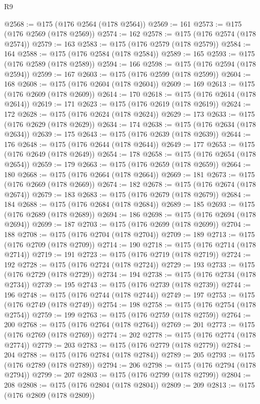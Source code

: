 \begin{lexlean}{R9}
\begin{coremodule}
{{{{{{{{{{{{{{{{{{{{{{{{{{{{{{{{{{{{{{{{{{{{{{{{{{{{{{{{{{{{{{{{{{{{{{{{{{{{{{{{{{{{{{{{{{{{{{{{{{{{{{{{{{{{@2568 := @175 (@176 @2564 (@178 @2564))
@2569 := 161
@2573 := @175 (@176 @2569 (@178 @2569))
@2574 := 162
@2578 := @175 (@176 @2574 (@178 @2574))
@2579 := 163
@2583 := @175 (@176 @2579 (@178 @2579))
@2584 := 164
@2588 := @175 (@176 @2584 (@178 @2584))
@2589 := 165
@2593 := @175 (@176 @2589 (@178 @2589))
@2594 := 166
@2598 := @175 (@176 @2594 (@178 @2594))
@2599 := 167
@2603 := @175 (@176 @2599 (@178 @2599))
@2604 := 168
@2608 := @175 (@176 @2604 (@178 @2604))
@2609 := 169
@2613 := @175 (@176 @2609 (@178 @2609))
@2614 := 170
@2618 := @175 (@176 @2614 (@178 @2614))
@2619 := 171
@2623 := @175 (@176 @2619 (@178 @2619))
@2624 := 172
@2628 := @175 (@176 @2624 (@178 @2624))
@2629 := 173
@2633 := @175 (@176 @2629 (@178 @2629))
@2634 := 174
@2638 := @175 (@176 @2634 (@178 @2634))
@2639 := 175
@2643 := @175 (@176 @2639 (@178 @2639))
@2644 := 176
@2648 := @175 (@176 @2644 (@178 @2644))
@2649 := 177
@2653 := @175 (@176 @2649 (@178 @2649))
@2654 := 178
@2658 := @175 (@176 @2654 (@178 @2654))
@2659 := 179
@2663 := @175 (@176 @2659 (@178 @2659))
@2664 := 180
@2668 := @175 (@176 @2664 (@178 @2664))
@2669 := 181
@2673 := @175 (@176 @2669 (@178 @2669))
@2674 := 182
@2678 := @175 (@176 @2674 (@178 @2674))
@2679 := 183
@2683 := @175 (@176 @2679 (@178 @2679))
@2684 := 184
@2688 := @175 (@176 @2684 (@178 @2684))
@2689 := 185
@2693 := @175 (@176 @2689 (@178 @2689))
@2694 := 186
@2698 := @175 (@176 @2694 (@178 @2694))
@2699 := 187
@2703 := @175 (@176 @2699 (@178 @2699))
@2704 := 188
@2708 := @175 (@176 @2704 (@178 @2704))
@2709 := 189
@2713 := @175 (@176 @2709 (@178 @2709))
@2714 := 190
@2718 := @175 (@176 @2714 (@178 @2714))
@2719 := 191
@2723 := @175 (@176 @2719 (@178 @2719))
@2724 := 192
@2728 := @175 (@176 @2724 (@178 @2724))
@2729 := 193
@2733 := @175 (@176 @2729 (@178 @2729))
@2734 := 194
@2738 := @175 (@176 @2734 (@178 @2734))
@2739 := 195
@2743 := @175 (@176 @2739 (@178 @2739))
@2744 := 196
@2748 := @175 (@176 @2744 (@178 @2744))
@2749 := 197
@2753 := @175 (@176 @2749 (@178 @2749))
@2754 := 198
@2758 := @175 (@176 @2754 (@178 @2754))
@2759 := 199
@2763 := @175 (@176 @2759 (@178 @2759))
@2764 := 200
@2768 := @175 (@176 @2764 (@178 @2764))
@2769 := 201
@2773 := @175 (@176 @2769 (@178 @2769))
@2774 := 202
@2778 := @175 (@176 @2774 (@178 @2774))
@2779 := 203
@2783 := @175 (@176 @2779 (@178 @2779))
@2784 := 204
@2788 := @175 (@176 @2784 (@178 @2784))
@2789 := 205
@2793 := @175 (@176 @2789 (@178 @2789))
@2794 := 206
@2798 := @175 (@176 @2794 (@178 @2794))
@2799 := 207
@2803 := @175 (@176 @2799 (@178 @2799))
@2804 := 208
@2808 := @175 (@176 @2804 (@178 @2804))
@2809 := 209
@2813 := @175 (@176 @2809 (@178 @2809))
}}}}}}}}}}}}}}}}}}}}}}}}}}}}}}}}}}}}}}}}}}}}}}}}}}}}}}}}}}}}}}}}}}}}}}}}}}}}}}}}}}}}}}}}}}}}}}}}}}}}}}}}}}}}
\end{coremodule}
\end{lexlean}
